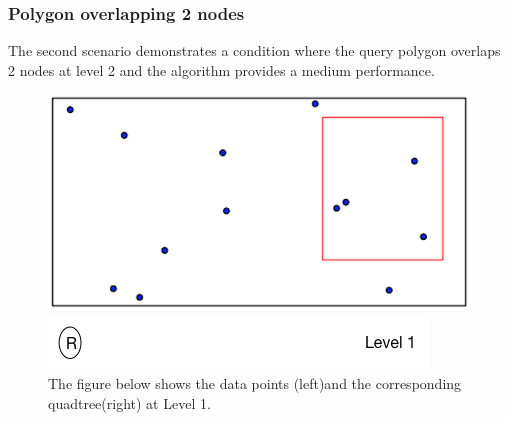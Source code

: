\documentclass{article}
\begin{document}
\vspace{2cm}

\subsubsection{Polygon overlapping 2 nodes}

The second scenario demonstrates a condition where the query polygon overlaps 2 nodes at level 2 and the algorithm provides a medium performance.

\vspace{1cm}
\begin{figure}[H]
  \centering
  \begin{minipage}[b]{0.35\textwidth}
    \includegraphics[width=\textwidth]{2Quad_1}  
  \end{minipage}
  \hfill
  \begin{minipage}[b]{0.6\textwidth}
    \includegraphics[width=\textwidth]{1_1Quad_1_tree}
  \end{minipage}
  \caption{The figure below shows the data points (left)and the corresponding quadtree(right) at Level 1.}
\end{figure}

\vspace{2cm}
\end{document}
